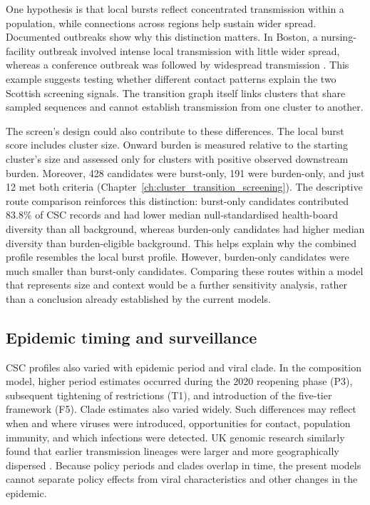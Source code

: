 One hypothesis is that local bursts reflect concentrated transmission within a population, while connections across regions help sustain wider spread. Documented outbreaks show why this distinction matters. In Boston, a nursing-facility outbreak involved intense local transmission with little wider spread, whereas a conference outbreak was followed by widespread transmission \citep{Lemieux2021}. This example suggests testing whether different contact patterns explain the two Scottish screening signals. The transition graph itself links clusters that share sampled sequences and cannot establish transmission from one cluster to another.

The screen's design could also contribute to these differences. The local burst score includes cluster size. Onward burden is measured relative to the starting cluster's size and assessed only for clusters with positive observed downstream burden. Moreover, 428 candidates were burst-only, 191 were burden-only, and just 12 met both criteria (Chapter~\ref{ch:cluster_transition_screening}). The descriptive route comparison reinforces this distinction: burst-only candidates contributed 83.8\% of CSC records and had lower median null-standardised health-board diversity than all background, whereas burden-only candidates had higher median diversity than burden-eligible background. This helps explain why the combined profile resembles the local burst profile. However, burden-only candidates were much smaller than burst-only candidates. Comparing these routes within a model that represents size and context would be a further sensitivity analysis, rather than a conclusion already established by the current models.

\subsection{Epidemic timing and surveillance}\label{sec:ch6_discussion_context}

CSC profiles also varied with epidemic period and viral clade. In the composition model, higher period estimates occurred during the 2020 reopening phase (P3), subsequent tightening of restrictions (T1), and introduction of the five-tier framework (F5). Clade estimates also varied widely. Such differences may reflect when and where viruses were introduced, opportunities for contact, population immunity, and which infections were detected. UK genomic research similarly found that earlier transmission lineages were larger and more geographically dispersed \citep{duPlessis2021}. Because policy periods and clades overlap in time, the present models cannot separate policy effects from viral characteristics and other changes in the epidemic.


